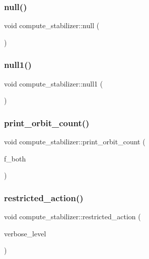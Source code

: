 \subsubsection{\texorpdfstring{null()}{null()}}
{\footnotesize\ttfamily void compute\+\_\+stabilizer\+::null (\begin{DoxyParamCaption}{ }\end{DoxyParamCaption})}

\mbox{\label{classcompute__stabilizer_aab107ccd433a41ca482a561feae048fc}} 
\subsubsection{\texorpdfstring{null1()}{null1()}}
{\footnotesize\ttfamily void compute\+\_\+stabilizer\+::null1 (\begin{DoxyParamCaption}{ }\end{DoxyParamCaption})}

\mbox{\label{classcompute__stabilizer_a92067e7d85262d77b1c6398e611ad78a}} 
\subsubsection{\texorpdfstring{print\+\_\+orbit\+\_\+count()}{print\_orbit\_count()}}
{\footnotesize\ttfamily void compute\+\_\+stabilizer\+::print\+\_\+orbit\+\_\+count (\begin{DoxyParamCaption}\item[{\mbox{\hyperlink{galois_8h_a09fddde158a3a20bd2dcadb609de11dc}{I\+NT}}}]{f\+\_\+both }\end{DoxyParamCaption})}

\mbox{\label{classcompute__stabilizer_a895df470da0ac14f812c3c4b6f2280b9}} 
\subsubsection{\texorpdfstring{restricted\+\_\+action()}{restricted\_action()}}
{\footnotesize\ttfamily void compute\+\_\+stabilizer\+::restricted\+\_\+action (\begin{DoxyParamCaption}\item[{\mbox{\hyperlink{galois_8h_a09fddde158a3a20bd2dcadb609de11dc}{I\+NT}}}]{verbose\+\_\+level }\end{DoxyParamCaption})}

